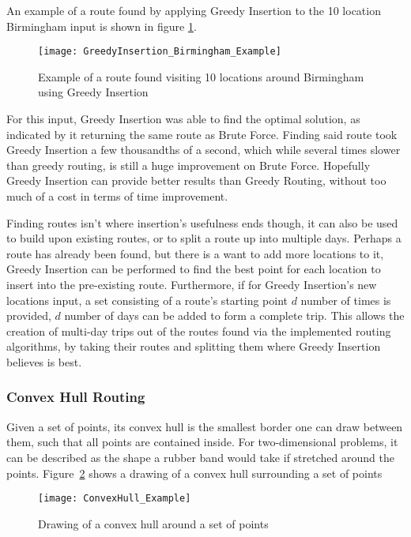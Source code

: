 \noindent
An example of a route found by applying Greedy Insertion to the 10 location Birmingham input is shown in figure
\ref{fig:GreedyInsertion_Birmingham_Example}.
\begin{figure}[H]
    \centering
    \texttt{[image: GreedyInsertion\_Birmingham\_Example]}
    \caption{Example of a route found visiting 10 locations around Birmingham using Greedy Insertion}
    \label{fig:GreedyInsertion_Birmingham_Example}
\end{figure}

\noindent
For this input, Greedy Insertion was able to find the optimal solution, as indicated by it returning the same route
as Brute Force.
Finding said route took Greedy Insertion a few thousandths of a second, which while several times slower than greedy
routing, is still a huge improvement on Brute Force.
Hopefully Greedy Insertion can provide better results than Greedy Routing, without too much of a cost in terms of
time improvement.

Finding routes isn't where insertion's usefulness ends though, it can also be used to build upon existing routes,
or to split a route up into multiple days.
Perhaps a route has already been found, but there is a want to add more locations to it, Greedy Insertion can be
performed to find the best point for each location to insert into the pre-existing route.
Furthermore, if for Greedy Insertion's new locations input, a set consisting of a route's starting point $d$ number of
times is provided,  $d$ number of days can be added to form a complete trip.
This allows the creation of multi-day trips out of the routes found via the implemented routing algorithms, by taking
their routes and splitting them where Greedy Insertion believes is best.

\subsubsection{Convex Hull Routing}\label{subsubsec:convex-hull}
Given a set of points, its convex hull is the smallest border one can draw between them, such that all points are
contained inside.
For two-dimensional problems, it can be described as the shape a rubber band would take if stretched around the points.
Figure~\ref{fig:ConvexHull_Example} shows a drawing of a convex hull surrounding a set of points
\begin{figure}[H]
    \centering
    \texttt{[image: ConvexHull\_Example]}
    \caption{Drawing of a convex hull around a set of points}
    \label{fig:ConvexHull_Example}
\end{figure}

